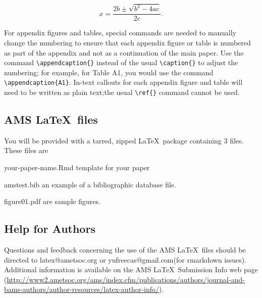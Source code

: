 \documentclass[draft]{ametsoc}
\begin{document}
\begin{equation}
\label{eq:1}
x=\frac{2b\pm\sqrt{b^{2}-4ac}}{2c}.  
\end{equation}

For appendix figures and tables, special commands are needed to manually
change the numbering to ensure that each appendix figure or table is
numbered as part of the appendix and not as a continuation of the main
paper. Use the command \texttt{\textbackslash{}appendcaption\{\}}
instead of the usual \texttt{\textbackslash{}caption\{\}} to adjust the
numbering; for example, for Table A1, you would use the command
\texttt{\textbackslash{}appendcaption\{A1\}}. In-text callouts for each
appendix figure and table will need to be written as plain text;the
usual \texttt{\textbackslash{}ref\{\}} command cannot be used.

\appendix[B]

\subsection{\texorpdfstring{AMS
\LaTeX~files}{AMS ~files}}\label{ams-files}

You will be provided with a tarred, zipped \LaTeX~package containing 3
files. These files are

\begin{description}

\item
  your-paper-name.Rmd template for your paper
\item
  amstest.bib an example of a bibliographic database file.
\item
  figure01.pdf are sample figures.

\end{description}

\subsection{Help for Authors}\label{help-for-authors}

Questions and feedback concerning the use of the AMS \LaTeX~files should
be directed to latex@ametsoc.org or yufreecas@gmail.com(for rmarkdown
issues). Additional information is available on the AMS
\LaTeX~Submission Info web page
(\url{http://www2.ametsoc.org/ams/index.cfm/publications/authors/journal-and-bams-authors/author-resources/latex-author-info/}).

\appendix[C]
\end{document}
